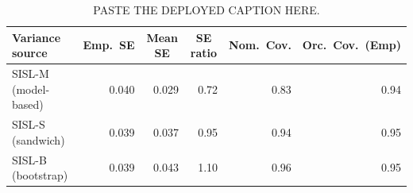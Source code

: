 \begin{table}[!htbp]\centering
\caption{PASTE THE DEPLOYED CAPTION HERE.}
\label{tab:sisl_variance}
\small
\begin{tabular}{lrrrrr}
\toprule
Variance source & \multicolumn{1}{c}{Emp.\ SE} & \multicolumn{1}{c}{Mean SE} & \multicolumn{1}{c}{SE ratio} & \multicolumn{1}{c}{Nom.\ Cov.} & \multicolumn{1}{c}{Orc.\ Cov.\ (Emp)} \\
\midrule
SISL-M (model-based) & 0.040 & 0.029 & 0.72 & 0.83 & 0.94 \\
SISL-S (sandwich) & 0.039 & 0.037 & 0.95 & 0.94 & 0.95 \\
SISL-B (bootstrap) & 0.039 & 0.043 & 1.10 & 0.96 & 0.95 \\
\bottomrule
\end{tabular}
\end{table}
